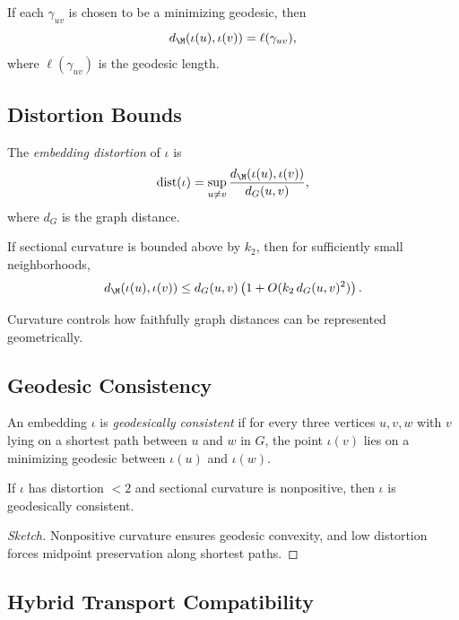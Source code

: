 \begin{lemma}
If each $\gamma_{uv}$ is chosen to be a minimizing geodesic, then
\[
d_\M(\iota(u),\iota(v)) = \ell(\gamma_{uv}),
\]
where $\ell(\gamma_{uv})$ is the geodesic length.
\end{lemma}

\subsection{Distortion Bounds}

\begin{definition}
The \emph{embedding distortion} of $\iota$ is
\[
\mathrm{dist}(\iota)
= \sup_{u \ne v}
\frac{d_\M(\iota(u),\iota(v))}{d_G(u,v)},
\]
where $d_G$ is the graph distance.
\end{definition}

\begin{lemma}
If sectional curvature is bounded above by $k_2$, then for sufficiently
small neighborhoods,
\[
d_\M(\iota(u),\iota(v))
\le d_G(u,v) \left( 1 + O(k_2\, d_G(u,v)^2) \right).
\]
\end{lemma}

\begin{remark}
Curvature controls how faithfully graph distances can be represented
geometrically.
\end{remark}

\subsection{Geodesic Consistency}

\begin{definition}
An embedding $\iota$ is \emph{geodesically consistent} if for every
three vertices $u,v,w$ with $v$ lying on a shortest path between $u$ and
$w$ in $G$, the point $\iota(v)$ lies on a minimizing geodesic between
$\iota(u)$ and $\iota(w)$.
\end{definition}

\begin{theorem}
If $\iota$ has distortion $< 2$ and sectional curvature is nonpositive,
then $\iota$ is geodesically consistent.
\end{theorem}

\begin{proof}[Sketch]
Nonpositive curvature ensures geodesic convexity, and low distortion
forces midpoint preservation along shortest paths.
\end{proof}

\subsection{Hybrid Transport Compatibility}

